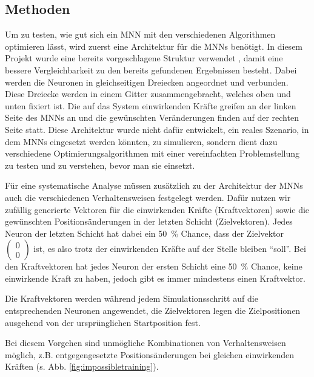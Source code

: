 \subsection{Methoden}

Um zu testen, wie gut sich ein MNN mit den verschiedenen Algorithmen optimieren lässt, wird zuerst eine Architektur für die MNNs benötigt.
In diesem Projekt wurde eine bereits vorgeschlagene Struktur verwendet \cite{Lee2022}, damit eine bessere Vergleichbarkeit zu den bereits gefundenen Ergebnissen besteht.
Dabei werden die Neuronen in gleichseitigen Dreiecken angeordnet und verbunden.
Diese Dreiecke werden in einem Gitter zusammengebracht, welches oben und unten fixiert ist.
Die auf das System einwirkenden Kräfte greifen an der linken Seite des MNNs an und die gewünschten Veränderungen finden auf der rechten Seite statt.
Diese Architektur wurde nicht dafür entwickelt, ein reales Szenario, in dem MNNs eingesetzt werden könnten, zu simulieren, sondern dient dazu verschiedene Optimierungsalgorithmen mit einer vereinfachten Problemstellung zu testen und zu verstehen, bevor man sie einsetzt.

Für eine systematische Analyse müssen zusätzlich zu der Architektur der MNNs auch die verschiedenen Verhaltensweisen festgelegt werden.
Dafür nutzen wir zufällig generierte Vektoren für die einwirkenden Kräfte (Kraftvektoren) sowie die gewünschten Positionsänderungen in der letzten Schicht (Zielvektoren).
Jedes Neuron der letzten Schicht hat dabei ein \SI{50}{\percent} Chance, dass der Zielvektor $\begin{pmatrix} 0 \\ 0 \end{pmatrix}$ ist, es also trotz der einwirkenden Kräfte auf der Stelle bleiben \enquote{soll}.
Bei den Kraftvektoren hat jedes Neuron der ersten Schicht eine \SI{50}{\percent} Chance, keine einwirkende Kraft zu haben, jedoch gibt es immer mindestens einen Kraftvektor.

Die Kraftvektoren werden während jedem Simulationsschritt auf die entsprechenden Neuronen angewendet, die Zielvektoren legen die Zielpositionen ausgehend von der ursprünglichen Startposition fest.

Bei diesem Vorgehen sind unmögliche Kombinationen von Verhaltensweisen möglich, z.B. entgegengesetzte Positionsänderungen bei gleichen einwirkenden Kräften (s. Abb. \ref{fig:impossibletraining}).

